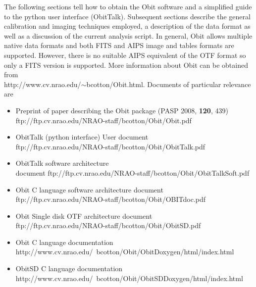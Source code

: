 \documentclass[11pt]{report}
\begin{document}
The following sections tell how to obtain the Obit software and a
simplified guide to the python user interface (ObitTalk).
Subsequent sections describe the general calibration and imaging
techniques employed, a description of the data format as well as a
discussion of the current analysis script.
In general, Obit allows multiple native data formats and both FITS and
AIPS image and tables formats are supported.
However, there is no suitable AIPS equivalent of the OTF format so
only a FITS version is supported.
More information about Obit can be obtained from\\
http://www.cv.nrao.edu/$\sim$bcotton/Obit.html. 
Documents of particular relevance are
\begin{itemize}
\item Preprint of paper describing the Obit package (PASP 2008, {\bf
  120}, 439) \\
ftp://ftp.cv.nrao.edu/NRAO-staff/bcotton/Obit/Obit.pdf
\item ObitTalk (python interface) User document \\
ftp://ftp.cv.nrao.edu/NRAO-staff/bcotton/Obit/ObitTalk.pdf
\item ObitTalk software architecture \\
document ftp://ftp.cv.nrao.edu/NRAO-staff/bcotton/Obit/ObitTalkSoft.pdf
\item Obit C language software architecture document \\
ftp://ftp.cv.nrao.edu/NRAO-staff/bcotton/Obit/OBITdoc.pdf
\item Obit Single disk OTF architecture document \\
ftp://ftp.cv.nrao.edu/NRAO-staff/bcotton/Obit/ObitSD.pdf
\item Obit C language documentation \\
http://www.cv.nrao.edu/~bcotton/Obit/ObitDoxygen/html/index.html 
\item ObitSD C language documentation \\
http://www.cv.nrao.edu/~bcotton/Obit/ObitSDDoxygen/html/index.html 
\end{itemize}
\end{document}
